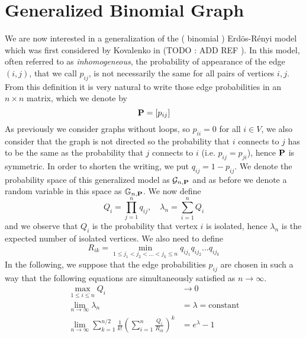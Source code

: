 \section{Generalized Binomial Graph}
We are now interested in a generalization of the ( binomial ) Erd\"os-R\'enyi model which was first considered by Kovalenko in (TODO : ADD REF ).
In this model, often referred to as \emph{inhomogeneous}, the probability of appearance of the edge $(i,j)$, that we call $p_{ij}$, is not necessarily the same for all pairs of vertices $i,j$.
\newline
From this definition it is very natural to write those edge probabilities in an $n\times n$ matrix, which we denote by
\begin{equation}
	\bold{P} = [p_{ij}]
\end{equation}
As previously we consider graphs without loops, so $p_{ii} = 0$ for all $i \in V$, we also consider that the graph is not directed so the probability that $i$ connects to $j$ has to be the same as the probability that $j$ connects to $i$ (i.e. $p_{ij} = p_{ji}$), hence $\bold{P}$ is symmetric.
In order to shorten the writing, we put $q_{ij} = 1 - p_{ij}$.
\newline
We denote the probability space of this generalized model as $\mathcal{G}_{n,\bold{P}}$ and as before we denote a random variable in this space as $\mathbb{G}_{n,\bold{P}}$.
\newline
We now define
\begin{equation}
	Q_i = \prod_{j=1}^n q_{ij}, \quad \lambda_n = \sum_{i=1}^nQ_i
\end{equation}
and we observe that $Q_i$ is the probability that vertex $i$ is isolated, hence $\lambda_n$ is the expected number of isolated vertices.
\newline
We also need to define
\begin{equation}
	R_{ik} = \min_{1\leq j_1<j_2< \ldots <j_k\leq n} q_{ij_1}q_{ij_2}\ldots q_{ij_k}
\end{equation}
In the following, we suppose that the edge probabilities $p_{ij}$ are chosen in such a way that the following equations are simultaneously satisfied as $n\to \infty$.
\begin{align}
	\max_{1\leq i \leq n} Q_i &\to 0 \label{eq:C1}\\
	\lim_{n \to \infty} \lambda_n &= \lambda = \text{constant} \label{eq:C2} \\
	\lim_{n\to \infty} \sum_{k=1}^{n/2} \frac{1}{k!}(\sum_{i=1}^n \frac{Q_i}{R_{ik}})^k &= e^{\lambda} - 1 \label{eq:C3}
\end{align}
